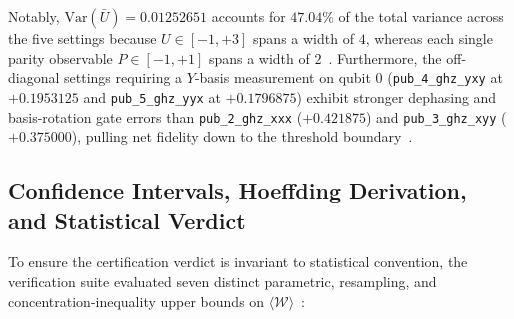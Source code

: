 \documentclass[10pt,letterpaper]{article}
\begin{document}
Notably, $\mathrm{Var}(\bar{U}) = 0.01252651$ accounts for $47.04\%$ of the total variance across the five settings because $U \in [-1, +3]$ spans a width of $4$, whereas each single parity observable $P \in [-1, +1]$ spans a width of $2$~\cite{qfx_doc}. Furthermore, the off-diagonal settings requiring a $Y$-basis measurement on qubit 0 (\texttt{pub\_4\_ghz\_yxy} at $+0.1953125$ and \texttt{pub\_5\_ghz\_yyx} at $+0.1796875$) exhibit stronger dephasing and basis-rotation gate errors than \texttt{pub\_2\_ghz\_xxx} ($+0.421875$) and \texttt{pub\_3\_ghz\_xyy} ($+0.375000$), pulling net fidelity down to the threshold boundary~\cite{qfx_doc}.

\subsection{Confidence Intervals, Hoeffding Derivation, and Statistical Verdict}

To ensure the certification verdict is invariant to statistical convention, the verification suite evaluated seven distinct parametric, resampling, and concentration-inequality upper bounds on $\langle \mathcal{W} \rangle$~\cite{qfx_doc}:
\end{document}
